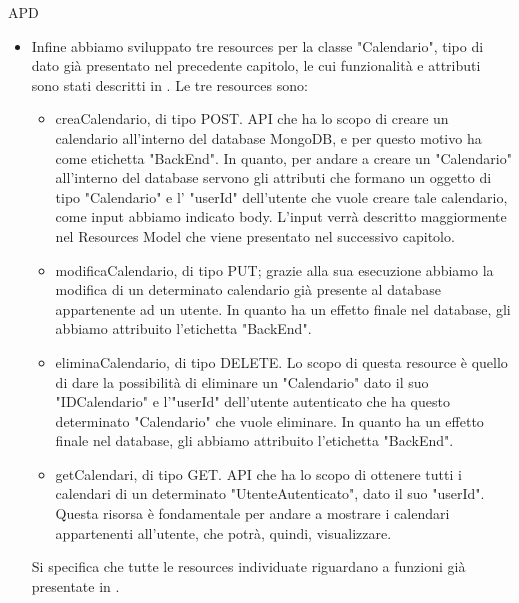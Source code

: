 \begin{listaPersonale} {APD}
\begin{listaPersonale2}[APD]{}
\begin{itemize}
            \item Infine abbiamo sviluppato tre resources per la classe "Calendario", tipo di dato già presentato nel precedente capitolo, le cui funzionalità e attributi sono stati descritti in . Le tre resources sono:
                  \begin{itemize}
                      \item creaCalendario, di tipo POST. API che ha lo scopo di creare un calendario all'interno del database MongoDB, e per questo motivo ha come etichetta "BackEnd". In quanto, per andare a creare un "Calendario" all'interno del database servono gli attributi che formano un oggetto di tipo "Calendario" e l' "userId" dell'utente che vuole creare tale calendario, come input abbiamo indicato body. L'input verrà descritto maggiormente nel Resources Model che viene presentato nel successivo capitolo.
                      \item modificaCalendario, di tipo PUT; grazie alla sua esecuzione abbiamo la modifica di un determinato calendario già presente al database appartenente ad un utente. In quanto ha un effetto finale nel database, gli abbiamo attribuito l'etichetta "BackEnd".
                      \item eliminaCalendario, di tipo DELETE. Lo scopo di questa resource è quello di dare la possibilità di eliminare un "Calendario" dato il suo "IDCalendario" e l'"userId" dell'utente autenticato che ha questo determinato "Calendario" che vuole eliminare. In quanto ha un effetto finale nel database, gli abbiamo attribuito l'etichetta "BackEnd".
                      \item getCalendari, di tipo GET. API che ha lo scopo di ottenere tutti i calendari di un determinato "UtenteAutenticato", dato il suo "userId". Questa risorsa è fondamentale per andare a mostrare i calendari appartenenti all'utente, che potrà, quindi, visualizzare.
                  \end{itemize}
                  Si specifica che tutte le resources individuate riguardano a funzioni già presentate in .
        \end{itemize}

        \begin{center}
            
        \end{center}
        \newpage



\end{listaPersonale2}
\end{listaPersonale}
